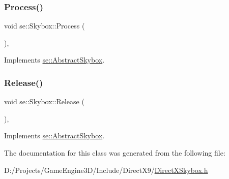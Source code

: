 \subsubsection{\texorpdfstring{Process()}{Process()}}
{\footnotesize\ttfamily void se\+::\+Skybox\+::\+Process (\begin{DoxyParamCaption}{ }\end{DoxyParamCaption})\hspace{0.3cm}{\ttfamily [override]}, {\ttfamily [virtual]}}



Implements \mbox{\hyperlink{classse_1_1_abstract_skybox_a652add712c92f3d7ebe7f82dc353fa1c}{se\+::\+Abstract\+Skybox}}.

\mbox{\label{classse_1_1_skybox_ad9a6b80274236240aba6eaafaf7d2e9c}} 
\subsubsection{\texorpdfstring{Release()}{Release()}}
{\footnotesize\ttfamily void se\+::\+Skybox\+::\+Release (\begin{DoxyParamCaption}{ }\end{DoxyParamCaption})\hspace{0.3cm}{\ttfamily [override]}, {\ttfamily [virtual]}}



Implements \mbox{\hyperlink{classse_1_1_abstract_skybox_a5aa158b7db1140ffc5c696347f32e2ef}{se\+::\+Abstract\+Skybox}}.



The documentation for this class was generated from the following file\+:\begin{DoxyCompactItemize}
\item 
D\+:/\+Projects/\+Game\+Engine3\+D/\+Include/\+Direct\+X9/\mbox{\hyperlink{_direct_x_skybox_8h}{Direct\+X\+Skybox.\+h}}\end{DoxyCompactItemize}
